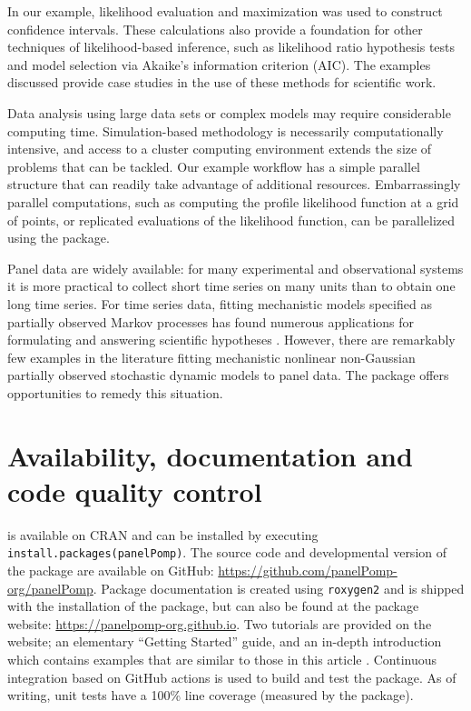 In our example, likelihood evaluation and maximization was used to construct confidence intervals.
These calculations also provide a foundation for other techniques of likelihood-based inference, such as likelihood ratio hypothesis tests and model selection via Akaike's information criterion (AIC).
The examples discussed provide case studies in the use of these methods for scientific work.

Data analysis using large data sets or complex models may require considerable computing time.
Simulation-based methodology is necessarily computationally intensive, and access to a cluster computing environment extends the size of problems that can be tackled.
Our example workflow has a simple parallel structure that can readily take advantage of additional resources.
Embarrassingly parallel computations, such as computing the profile likelihood function at a grid of points, or replicated evaluations of the likelihood function, can be parallelized using the  package.

Panel data are widely available: for many experimental and observational systems it is more practical to collect short time series on many units than to obtain one long time series.
For time series data, fitting mechanistic models specified as partially observed Markov processes has found numerous applications for formulating and answering scientific hypotheses \citep{breto09, king16}.
However, there are remarkably few examples in the literature fitting mechanistic nonlinear non-Gaussian partially observed stochastic dynamic models to panel data.
The  package offers opportunities to remedy this situation.

\section{Availability, documentation and code quality control}\label{availability-documentation-and-code-quality-control}

 is available on CRAN and can be installed by executing \texttt{install.packages(\textquotesingle{}panelPomp\textquotesingle{})}.
The source code and developmental version of the package are available on GitHub: \url{https://github.com/panelPomp-org/panelPomp}.
Package documentation is created using \texttt{roxygen2} and is shipped with the installation of the package, but can also be found at the package website: \url{https://panelpomp-org.github.io}.
Two tutorials are provided on the website; an elementary ``Getting Started'' guide, and an in-depth introduction which contains examples that are similar to those in this article \citep{breto24}.
Continuous integration based on GitHub actions is used to build and test the package.
As of writing, unit tests have a 100\% line coverage (measured by the  package).


